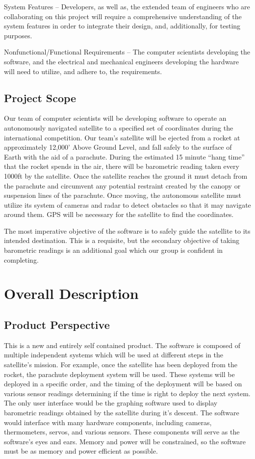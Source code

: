 \documentclass{scrreprt}
\begin{document}
System Features – Developers, as well as, the extended team of engineers who are collaborating on this project will require a comprehensive understanding of the system features in order to integrate their design, and, additionally, for testing purposes.

Nonfunctional/Functional Requirements – The computer scientists developing the software, and the electrical and mechanical engineers developing the hardware will need to utilize, and adhere to, the requirements.

\section{Project Scope}
Our team of computer scientists will be developing software to operate an autonomously navigated satellite to a specified set of coordinates during the international competition. Our team’s satellite will be ejected from a rocket at approximately 12,000’ Above Ground Level, and fall safely to the surface of Earth with the aid of a parachute. During the estimated 15 minute “hang time” that the rocket spends in the air, there will be barometric reading taken every 1000ft by the satellite. Once the satellite reaches the ground it must detach from the parachute and circumvent any potential restraint created by the canopy or suspension lines of the parachute. Once moving, the autonomous satellite must utilize its system of cameras and radar to detect obstacles so that it may navigate around them. GPS will be necessary for the satellite to find the coordinates.

The most imperative objective of the software is to safely guide the satellite to its intended destination. This is a requisite, but the secondary objective of taking barometric readings is an additional goal which our group is confident in completing.

\chapter{Overall Description}

\section{Product Perspective}
This is a new and entirely self contained product. The software is composed of multiple independent systems which will be used at different steps in the satellite's mission. For example, once the satellite has been deployed from the rocket, the parachute deployment system will be used. These systems will be deployed in a specific order, and the timing of the deployment will be based on various sensor readings determining if the time is right to deploy the next system. The only user interface would be the graphing software used to display barometric readings obtained by the satellite during it's descent. The software would interface with many hardware components, including cameras, thermometers, servos, and various sensors. These components will serve as the software's eyes and ears. Memory and power will be constrained, so the software must be as memory and power efficient as possible.
\end{document}
